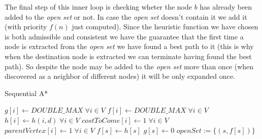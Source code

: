 \documentclass[twocolumn, switch]{article} %
\begin{document}
The final step of this inner loop is checking wheter the node $b$ has already been added to the 
\textit{open set} or not. In case the \textit{open set} doesn't contain it we add it (with priority
$f(n)$ just computed).
Since the heuristic function we have chosen is both admissible and consistent we have the guarantee 
that the first time a node is extracted from the \textit{open set} we have found a best path to it (this
is why when the destination node is extracted we can terminate having found the best path). So despite
the node may be added to the \textit{open set} more than once (when discovered as a neighbor of different nodes)
it will be only expanded once.
\begin{algorithm}[ht!] 
\caption{Sequential A*}\label{alg:two}
$g[i] \gets DOUBLE\_MAX \;\forall i \in V$\;
$f[i] \gets DOUBLE\_MAX \;\forall i \in V$\;
$h[i] \gets h(i, d) \; \forall i \in V$\;
$costToCome[i] \gets 1 \; \forall i \in V$\;
$parentVertex[i] \gets 1 \; \forall i \in V$\;
$f[s] \gets h[s]$\;
$g[s] \gets 0$\;
$openSet := \{(s, f[s])\}$\;
\end{algorithm}
\end{document}
